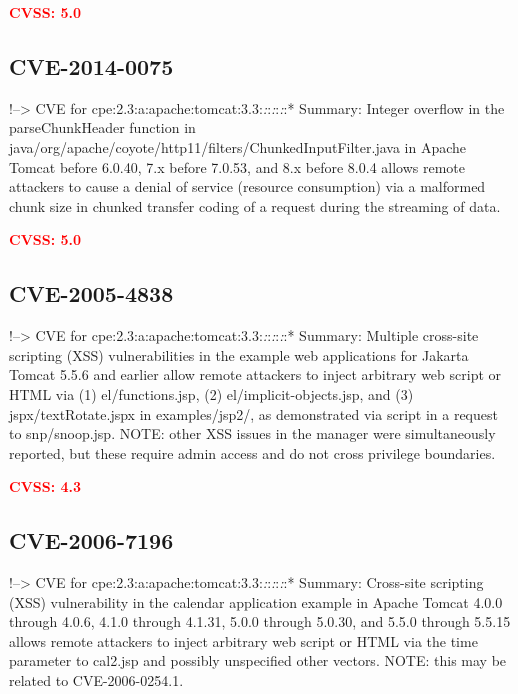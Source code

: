 \documentclass[a4paper, 12pt]{article}
\begin{document}
\textbf{\textcolor{red}{CVSS: 5.0}}

\hypertarget{cve-2014-0075}{%
\subsection{CVE-2014-0075}\label{cve-2014-0075}}

!--\textgreater{} CVE for
cpe:2.3:a:apache:tomcat:3.3:\emph{:}:\emph{:}:\emph{:}:* Summary:
Integer overflow in the parseChunkHeader function in
java/org/apache/coyote/http11/filters/ChunkedInputFilter.java in Apache
Tomcat before 6.0.40, 7.x before 7.0.53, and 8.x before 8.0.4 allows
remote attackers to cause a denial of service (resource consumption) via
a malformed chunk size in chunked transfer coding of a request during
the streaming of data.

\textbf{\textcolor{red}{CVSS: 5.0}}

\hypertarget{cve-2005-4838}{%
\subsection{CVE-2005-4838}\label{cve-2005-4838}}

!--\textgreater{} CVE for
cpe:2.3:a:apache:tomcat:3.3:\emph{:}:\emph{:}:\emph{:}:* Summary:
Multiple cross-site scripting (XSS) vulnerabilities in the example web
applications for Jakarta Tomcat 5.5.6 and earlier allow remote attackers
to inject arbitrary web script or HTML via (1) el/functions.jsp, (2)
el/implicit-objects.jsp, and (3) jspx/textRotate.jspx in examples/jsp2/,
as demonstrated via script in a request to snp/snoop.jsp. NOTE: other
XSS issues in the manager were simultaneously reported, but these
require admin access and do not cross privilege boundaries.

\textbf{\textcolor{red}{CVSS: 4.3}}

\hypertarget{cve-2006-7196}{%
\subsection{CVE-2006-7196}\label{cve-2006-7196}}

!--\textgreater{} CVE for
cpe:2.3:a:apache:tomcat:3.3:\emph{:}:\emph{:}:\emph{:}:* Summary:
Cross-site scripting (XSS) vulnerability in the calendar application
example in Apache Tomcat 4.0.0 through 4.0.6, 4.1.0 through 4.1.31,
5.0.0 through 5.0.30, and 5.5.0 through 5.5.15 allows remote attackers
to inject arbitrary web script or HTML via the time parameter to
cal2.jsp and possibly unspecified other vectors. NOTE: this may be
related to CVE-2006-0254.1.
\end{document}

